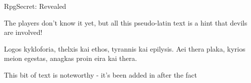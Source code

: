 \begin{ExampleBlock}{RpgSecret: Revealed}


\lorumIpsumOne%
\begin{RpgSecret}{}
    The players don't know it yet, but all this pseudo-latin text is a hint that devils are involved!  
\end{RpgSecret}
\lorumIpsumTwo{}
\begin{RpgSecret}{
    Logos kykloforia, thelxis kai ethos, tyrannis kai epilysis. Aei thera plaka, kyrios meion egestas, anagkas proin eira kai thera.
    }
        
    This bit of text is noteworthy - it's been added in after the fact
\end{RpgSecret}
\lorumIpsumThree


\end{ExampleBlock}
